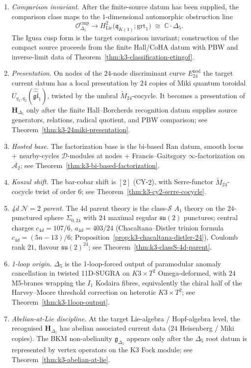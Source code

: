 \begin{enumerate}[label=\textup{(R\arabic*)}]
\item \emph{Comparison invariant.} After the finite-source datum has
 been supplied, the comparison class maps to the $1$-dimensional
 automorphic obstruction line
 \[
 \mathcal{O}^{\mathrm{cmp}}_{\Delta_5}
 \longrightarrow
 H^2_{\mathrm{Lie}}\bigl(\mathfrak{q}_{K(1)};\mathrm{grt}_1\bigr)
 \;\cong\;
 \mathbb{C}\cdot \Delta_5.
 \]
 The Igusa cusp form is the target comparison invariant; construction
 of the compact source proceeds from the finite Hall/CoHA datum with
 PBW and inverse-limit data of
 Theorem~\ref{thm:k3-classification-etingof}.
\item \emph{Presentation.} On nodes of the $24$-node discriminant curve
 $E^{\mathrm{nod}}_{24}$ the target current datum has a local presentation
 by $24$ copies of Miki quantum toroidal
 $U_{q_1,q_2}(\widehat{\widehat{\mathfrak{gl}}}_1)$, twisted by the umbral
 $\widetilde{M}_{24}$-cocycle.  It becomes a presentation of
 $\mathbf{H}_{\Delta_5}$ only after the finite Hall--Borcherds recognition
 datum supplies source generators, relations, radical quotient, and PBW
 comparison; see Theorem~\ref{thm:k3-24miki-presentation}.
\item \emph{Hosted base.} The factorization base is the bi-based Ran datum, smooth
 locus + nearby-cycles $\mathcal{D}$-modules at nodes + Francis--Gaitsgory
 $\infty$-factorization on $\overline{\mathcal{A}_2}$; see
 Theorem~\ref{thm:k3-bi-based-factorization}.
\item \emph{Koszul shift.} The bar-cobar shift is $[2]$ (CY-$2$), with Serre-functor
 $\widetilde{M}_{24}$-cocycle twist of order $6$; see
 Theorem~\ref{thm:k3-cy2-serre-cocycle}.
\item \emph{4d $\mathcal{N}=2$ parent.} The 4d parent theory is the class-$\mathcal{S}$
 $A_1$ theory on the $24$-punctured sphere $\Sigma_{0,24}$ with $24$ maximal regular
 $\mathfrak{su}(2)$ punctures; central charges $c_{4d}=107/6$, $a_{4d}=403/24$
 (Chacaltana--Distler trinion formula $c_{4d} = (5n-13)/6$;
 Proposition~\ref{prop:k3-chacaltana-distler-24}),
 Coulomb rank $21$, flavour $\mathfrak{su}(2)^{24}$; see
 Theorem~\ref{thm:k3-classS-4d-parent}.
\item \emph{1-loop origin.} $\Delta_5$ is the 1-loop-forced output of paramodular
 anomaly cancellation in twisted 11D-SUGRA on $K3\times T^2$ Omega-deformed, with
 $24$ M5-branes wrapping the $I_1$ Kodaira fibres, equivalently the chiral half of
 the Harvey--Moore threshold correction on heterotic $K3\times T^2$; see
 Theorem~\ref{thm:k3-1loop-output}.
\item \emph{Abelian-at-Lie discipline.} At the target Lie-algebra /
 Hopf-algebra level, the recognised $\mathbf{H}_{\Delta_5}$ has abelian
 associated current data ($24$ Heisenberg / Miki copies). The BKM
 non-abelianity $\mathfrak{g}_{\Delta_5}$ appears only after the
 $\Delta_5$ root datum is represented by vertex operators on the K3 Fock
 module; see
 Theorem~\ref{thm:k3-abelian-at-lie}.
\end{enumerate}

